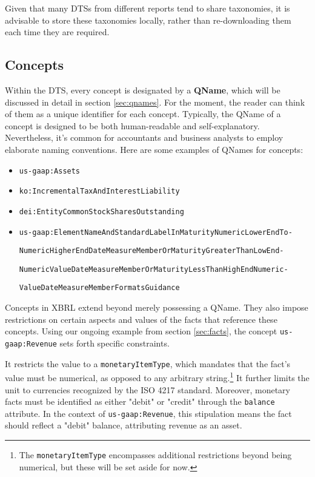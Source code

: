 Given that many DTSs from different reports tend to share taxonomies, it is advisable to store these taxonomies locally,
rather than re-downloading them each time they are required.

\subsection{Concepts}

Within the DTS, every concept is designated by a \textbf{QName},
which will be discussed in detail in section \ref{sec:qnames}.
For the moment, the reader can think of them as a unique identifier for each concept.
Typically, the QName of a concept is designed to be both human-readable and self-explanatory.
Nevertheless, it's common for accountants and business analysts to employ elaborate naming conventions.
Here are some examples of QNames for concepts:

\begin{itemize}
    \item \texttt{us-gaap:Assets}
    \item \texttt{ko:IncrementalTaxAndInterestLiability}
    \item \texttt{dei:EntityCommonStockSharesOutstanding}
    \item \texttt{us-gaap:ElementNameAndStandardLabelInMaturityNumericLowerEndTo-} 
    
    \texttt{NumericHigherEndDateMeasureMemberOrMaturityGreaterThanLowEnd-}
    
    \texttt{NumericValueDateMeasureMemberOrMaturityLessThanHighEndNumeric-}
    
    \texttt{ValueDateMeasureMemberFormatsGuidance}
\end{itemize}

Concepts in XBRL extend beyond merely possessing a QName.
They also impose restrictions on certain aspects and values of the facts that reference these concepts.
Using our ongoing example from section \ref{sec:facts}, the concept \texttt{us-gaap:Revenue} sets forth specific constraints.

It restricts the value to a \texttt{monetaryItemType},
which mandates that the fact's value must be numerical,
as opposed to any arbitrary string.\footnote{The \texttt{monetaryItemType} encompasses additional restrictions beyond being numerical, but these will be set aside for now.}
It further limits the unit to currencies recognized by the ISO 4217 standard.\cite{eba2018filingrules}
Moreover, monetary facts must be identified as either "debit" or "credit" through the \texttt{balance} attribute.
In the context of \texttt{us-gaap:Revenue}, this stipulation means the fact should reflect a "debit" balance, attributing revenue as an asset.

